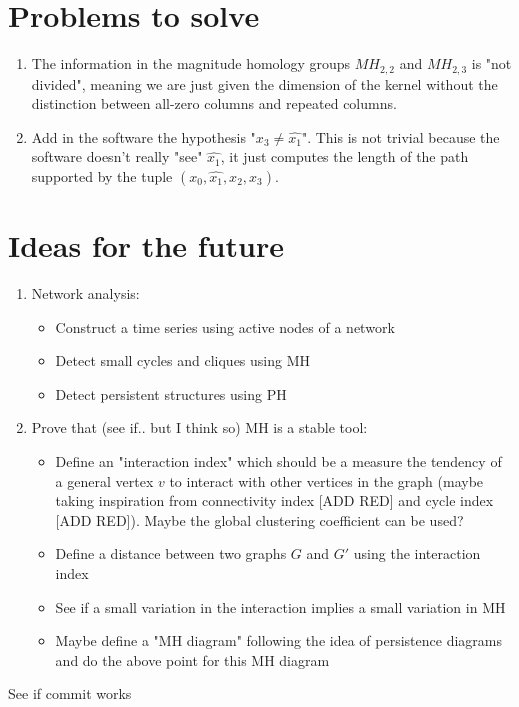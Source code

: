 \documentclass{article}
\begin{document}
	\section{Problems to solve}
	
	\begin{enumerate}
		\item The information in the magnitude homology groups $MH_{2,2}$ and $MH_{2,3}$ is "not divided", meaning we are just given the dimension of the kernel without the distinction between all-zero columns and repeated columns.
		\item Add in the software the hypothesis "$x_3 \neq \hat{x_1}$". This is not trivial because the software doesn't really "see" $\hat{x_1}$, it just computes the length of the path supported by the tuple $(x_0,\hat{x_1},x_2,x_3)$.
	\end{enumerate}

\section{Ideas for the future}

\begin{enumerate}
	\item Network analysis:
	\begin{itemize}
		\item Construct a time series using active nodes of a network
		\item Detect small cycles and cliques using MH
		\item Detect persistent structures using PH
	\end{itemize}

	\item Prove that (see if.. but I think so) MH is a stable tool:
	\begin{itemize}
		\item Define an "interaction index" which should be a measure the tendency of a general vertex $v$ to interact with other vertices in the graph (maybe taking inspiration from connectivity index [ADD RED] and cycle index [ADD RED]). Maybe the global clustering coefficient can be used?
		\item Define a distance between two graphs $G$ and $G'$ using the interaction index
		\item See if a small variation in the interaction implies a small variation in MH
		\item Maybe define a "MH diagram" following the idea of persistence diagrams and do the above point for this MH diagram  
	\end{itemize}
	
\end{enumerate}

See if commit works
	
	
\end{document}

